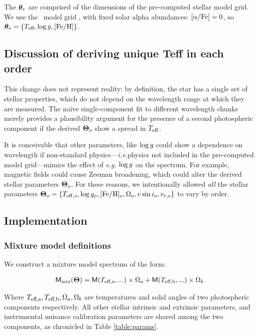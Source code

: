 \documentclass[twocolumn]{emulateapj}%
\begin{document}
The ${\bm \theta}_{\ast}$ are comprised of the dimensions of the pre-computed stellar model grid.  We use the \PHOENIX\ model grid \citep{husser13}, with fixed solar alpha abundances: $[\alpha/{\rm Fe}] = 0$, so ${\bm \theta}_{\ast} = \{T_\textrm{eff}, \log g, [{\rm Fe}/{\rm H}] \}$.


\subsection{Discussion of deriving unique Teff in each order}
\label{sec:approach12}


This change does not represent reality: by definition, the star has a single set of stellar properties, which do not depend on the wavelength range at which they are measured.  The na\"ive single-component fit to different wavelength chunks merely provides a plausibility argument for the presence of a second photospheric component if the derived ${\bm \Theta}_o$ show a spread in $T_\textrm{eff}$.  

It is conceivable that other parameters, like $\log g$ could show a dependence on wavelength if non-standard physics---\emph{i.e.}physics not included in the pre-computed model grid---mimics the effect of \emph{e.g.} $\log g$ on the spectrum.  For example, magnetic fields could cause Zeeman broadening, which could alter the derived stellar parameters ${\bm \Theta}_o$.  For these reasons, we intentionally allowed \emph{all} the stellar parameters ${\bm \Theta}_o = \{T_{\mathrm{eff},o}, \log{g_o}, [{\rm Fe}/{\rm H}]_o, \Omega_{o}, v\sin{i}_o, v_{r,o}\}$ to vary by order.  


\subsection{Implementation}

\subsubsection{Mixture model definitions}

We construct a mixture model spectrum of the form:

\begin{eqnarray} \label{eqn:mix_M}
\mathsf{M}_{\mathrm{mix}}({\bm \Theta}) = \mathsf{M}(T_\textrm{eff,a}, ...) \times \Omega_a + \mathsf{M}(T_\textrm{eff,b}, ...) \times \Omega_b
\end{eqnarray}


Where $T_\textrm{eff,a}, T_\textrm{eff,b}, \Omega_a, \Omega_b$ are temperatures and solid angles of two photospheric components respectively.  All other stellar intrinsic and extrinsic parameters, and instrumental nuisance calibration parameters are shared among the two components, as chronicled in Table \ref{table:params}.
\end{document}
